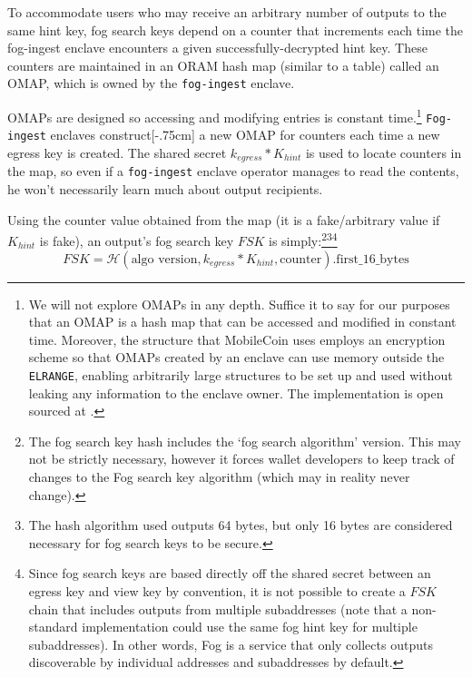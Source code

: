 To accommodate users who may receive an arbitrary number of outputs to the same hint key, fog search keys depend on a counter that increments each time the fog-ingest enclave encounters a given successfully-decrypted hint key. These counters are maintained in an ORAM hash map (similar to a table) called an OMAP, which is owned by the {\tt fog-ingest} enclave.

OMAPs are designed so accessing and modifying entries is constant time.\footnote{We will not explore OMAPs in any depth. Suffice it to say for our purposes that an OMAP is a hash map that can be accessed and modified in constant time. Moreover, the structure that MobileCoin uses employs an encryption scheme so that OMAPs created by an enclave can use memory outside the {\tt ELRANGE}, enabling arbitrarily large structures to be set up and used without leaking any information to the enclave owner. The implementation is open sourced at \cite{mobilecoin-omap-source-code}.} {\tt Fog-ingest} enclaves construct[-.75cm] a new OMAP for counters each time a new egress key is created. The shared secret $k_{egress}*K_{hint}$ is used to locate counters in the map, so even if a {\tt fog-ingest} enclave operator manages to read the contents, he won't necessarily learn much about output recipients.

Using the counter value obtained from the map (it is a fake/arbitrary value if $K_{hint}$ is fake), an output's fog search key $FSK$ is simply:\footnote{The fog search key hash includes the `fog search algorithm' version. This may not be strictly necessary, however it forces wallet developers to keep track of changes to the Fog search key algorithm (which may in reality never change).}\footnote{The hash algorithm used outputs 64 bytes, but only 16 bytes are considered necessary for fog search keys to be secure.}\footnote{Since fog search keys are based directly off the shared secret between an egress key and view key by convention, it is not possible to create a $FSK$ chain that includes outputs from multiple subaddresses (note that a non-standard implementation could use the same fog hint key for multiple subaddresses). In other words, Fog is a service that only collects outputs discoverable by individual addresses and subaddresses by default.}\vspace{.155cm}
\[FSK = \mathcal{H}(\textrm{algo version}, k_{egress}*K_{hint}, \textrm{counter})\textrm{.first\_16\_bytes}\]


